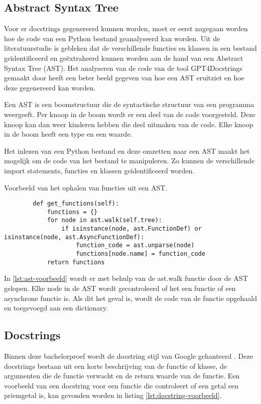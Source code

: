 \subsection{Abstract Syntax Tree}
\label{sec:bestanddocumentatie-ast}
Voor er docstrings gegenereerd kunnen worden, moet er eerst nagegaan worden hoe de code van een Python bestand geanalyseerd kan worden.
Uit de literatuurstudie is gebleken dat de verschillende functies en klassen in een bestand geïdentificeerd en geëxtraheerd kunnen worden aan de hand van een Abstract Syntax Tree (AST).
Het analyseren van de code van de tool GPT4Docstrings gemaakt door \textcite{Trofficus2023} heeft een beter beeld gegeven van hoe een AST eruitziet en hoe deze gegenereerd kan worden.

Een AST is een boomstructuur die de syntactische structuur van een programma weergeeft.
Per knoop in de boom wordt er een deel van de code voorgesteld. 
Deze knoop kan dan weer kinderen hebben die deel uitmaken van de code.
Elke knoop in de boom heeft een type en een waarde.

Het inlezen van een Python bestand en deze omzetten naar een AST maakt het mogelijk om de code van het bestand te manipuleren.
Zo kunnen de verschillende import statements, functies en klassen geïdentificeerd worden.

\begin{listing}
    \caption[Ophalen functies uit AST]{Voorbeeld van het ophalen van functies uit een AST.}
    \label{lst:ast-voorbeeld}
    \begin{verbatim}
        def get_functions(self):
            functions = {}
            for node in ast.walk(self.tree):
                if isinstance(node, ast.FunctionDef) or isinstance(node, ast.AsyncFunctionDef):
                    function_code = ast.unparse(node)
                    functions[node.name] = function_code
            return functions
    \end{verbatim}
\end{listing}

In \ref{lst:ast-voorbeeld} wordt er met behulp van de ast.walk functie door de AST gelopen.
Elke node in de AST wordt gecontroleerd of het een functie of een asynchrone functie is.
Als dit het geval is, wordt de code van de functie opgehaald en toegevoegd aan een dictionary.

\subsection{Docstrings}
\label{sec:bestanddocumentatie-docstrings}
Binnen deze bachelorproef wordt de docstring stijl van Google gehanteerd \autocite{GPT2024}.
Deze docstrings bestaan uit een korte beschrijving van de functie of klasse, de argumenten die de functie verwacht en de return waarde van de functie.
Een voorbeeld van een docstring voor een functie die controleert of een getal een priemgetal is, kan gevonden worden in listing \ref{lst:docstring-voorbeeld}.

